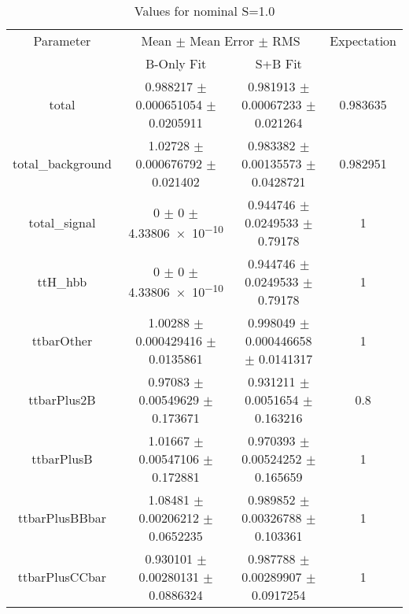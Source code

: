 \begin{table}
\centering
\caption{Values for nominal S=1.0}
\begin{tabular}{cccc}
\toprule
Parameter & \multicolumn{2}{c}{Mean $\pm$ Mean Error $\pm$ RMS} & Expectation\\
 & B-Only Fit & S+B Fit & \\
\midrule
total & \num{0.988217} $\pm$ \num{0.000651054} $\pm$ \num{0.0205911} & \num{0.981913} $\pm$ \num{0.00067233} $\pm$ \num{0.021264} & \num{0.983635}\\
total\_background & \num{1.02728} $\pm$ \num{0.000676792} $\pm$ \num{0.021402} & \num{0.983382} $\pm$ \num{0.00135573} $\pm$ \num{0.0428721} & \num{0.982951}\\
total\_signal & \num{0} $\pm$ \num{0} $\pm$ \num{4.33806e-10} & \num{0.944746} $\pm$ \num{0.0249533} $\pm$ \num{0.79178} & \num{1}\\
ttH\_hbb & \num{0} $\pm$ \num{0} $\pm$ \num{4.33806e-10} & \num{0.944746} $\pm$ \num{0.0249533} $\pm$ \num{0.79178} & \num{1}\\
ttbarOther & \num{1.00288} $\pm$ \num{0.000429416} $\pm$ \num{0.0135861} & \num{0.998049} $\pm$ \num{0.000446658} $\pm$ \num{0.0141317} & \num{1}\\
ttbarPlus2B & \num{0.97083} $\pm$ \num{0.00549629} $\pm$ \num{0.173671} & \num{0.931211} $\pm$ \num{0.0051654} $\pm$ \num{0.163216} & \num{0.8}\\
ttbarPlusB & \num{1.01667} $\pm$ \num{0.00547106} $\pm$ \num{0.172881} & \num{0.970393} $\pm$ \num{0.00524252} $\pm$ \num{0.165659} & \num{1}\\
ttbarPlusBBbar & \num{1.08481} $\pm$ \num{0.00206212} $\pm$ \num{0.0652235} & \num{0.989852} $\pm$ \num{0.00326788} $\pm$ \num{0.103361} & \num{1}\\
ttbarPlusCCbar & \num{0.930101} $\pm$ \num{0.00280131} $\pm$ \num{0.0886324} & \num{0.987788} $\pm$ \num{0.00289907} $\pm$ \num{0.0917254} & \num{1}\\
\bottomrule
\end{tabular}
\end{table}